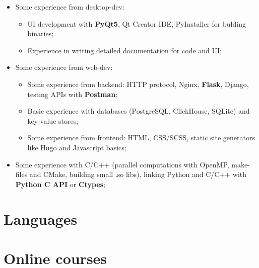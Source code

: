 \documentclass[12pt,a4paper,roman]{moderncv}
\begin{document}
\begin{itemize}
 \item Some experience from desktop-dev:\newline
    \begin{itemize}
        \item UI development with \textbf{PyQt5}, Qt Creator IDE, PyInstaller for bulding binaries; \newline
        \item Experience in writing detailed documentation for code and UI; \newline
    \end{itemize}
 \item Some experience from web-dev: \newline
    \begin{itemize}
        \item Some experience from backend: 
          HTTP protocol, Nginx, \textbf{Flask}, Django, testing APIs with \textbf{Postman};\newline
        \item Basic experience with databases (PostgreSQL, ClickHouse, SQLite) and key-value stores;\newline
        \item Some experience from frontend: HTML, CSS/SCSS, static site generators like Hugo and Javascript basics; \newline
    \end{itemize}
 \item Some experience with C/C++ (parallel computations with OpenMP, make-files and CMake, building small .so libs), 
 linking Python and C/C++ with \textbf{Python C API} or \textbf{Ctypes}; \newline \newline
 \end{itemize} 
\section{Languages}
\section{Online courses}
\newline\newline
{} 
\end{document}
